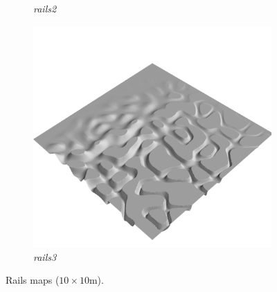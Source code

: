 \documentclass[../document.tex]{subfiles}
\begin{document}
\begin{figure}[H]
\begin{subfigure}[b]{0.32\linewidth}
            \caption{\emph{rails2}}
            \end{subfigure}    
          \begin{subfigure}[b]{0.32\textwidth}
            \includegraphics[width=\textwidth]{../img/hm3d/rails3.png}
            \caption{\emph{rails3}}
        \end{subfigure}    
    \caption{Rails maps ($10\times10$m).}
\end{figure}
\end{document}
